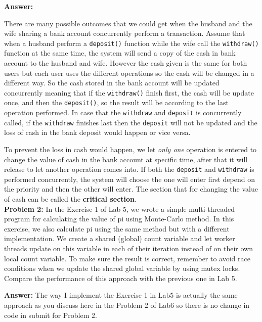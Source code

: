 \documentclass[a4paper]{article}
\begin{document}
\textbf{Answer:} \\

\par{There are many possible outcomes that we could get when the husband and the wife sharing a bank account concurrently perform a transaction. Assume that when a husband perform a \texttt{deposit()} function while the wife call the \texttt{withdraw()} function at the same time, the system will send a copy of the cash in bank account to the husband and wife. However the cash given is the same for both users but each user uses the different operations so the cash will be changed in a different way. So the cash stored in the bank account will be updated concurrently meaning that if the \texttt{withdraw()} finish first, the cash will be update once, and then the \texttt{deposit()}, so the result will be according to the last operation performed. In case that the \texttt{withdraw} and \texttt{deposit} is concurrently called, if the \texttt{withdraw} finishes last then the \texttt{deposit} will not be updated and the loss of cash in the bank deposit would happen or vice versa.} \\

\par{To prevent the loss in cash would happen, we let \textit{only one} operation is entered to change the value of cash in the bank account at specific time, after that it will release to let another operation comes into. If both the \texttt{deposit} and \texttt{withdraw} is performed concurrently, the system will choose the one will enter first depend on the priority and then the other will enter. The section that for changing the value of cash can be called the \textbf{critical section}.} \\

\textbf{Problem 2:} In the Exercise 1 of Lab 5, we wrote a simple multi-threaded program for calculating the
value of pi using Monte-Carlo method. In this exercise, we also calculate pi using the same method but
with a different implementation. We create a shared (global) count variable and let worker threads update
on this variable in each of their iteration instead of on their own local count variable. To make sure the
result is correct, remember to avoid race conditions when we update the shared global variable by using
mutex locks. Compare the performance of this approach with the previous one in Lab 5.

\textbf{Answer:} The way I implement the Exercise 1 in Lab5 is actually the same approach as you discuss here in the Problem 2 of Lab6 so there is no change in code in submit for Problem 2.
\end{document}
